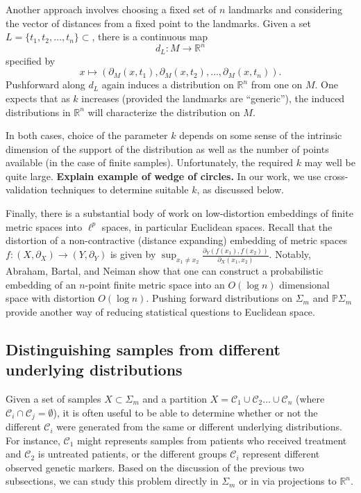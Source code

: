 \documentclass[a4paper,11pt]{article}
\newcommand{\aC}{\mathcal{C}}
\begin{document}
Another approach involves choosing a fixed set of $n$ landmarks and considering the vector of distances from a fixed point to the landmarks.
Given a set $L = \{t_1, t_2, \ldots, t_n\} \subset $, there is a continuous map
\[
d_L \colon M \to \mathbb{R}^n
\]
specified by
\[
x \mapsto (\partial_M(x,t_1), \partial_M(x,t_2), \ldots, \partial_M(x,t_n)).
\]
Pushforward along $d_L$ again induces a distribution on $\mathbb{R}^n$ from one on $M$.
One expects that as $k$ increases (provided the landmarks are ``generic''), the induced distributions in $\mathbb{R}^n$ will characterize the distribution on $M$.

In both cases, choice of the parameter $k$ depends on some sense of the intrinsic dimension of the support of the distribution as well as the number of points available (in the case of finite samples).
Unfortunately, the required $k$ may well be quite large.
{\bf Explain example of wedge of circles.}
In our work, we use cross-validation techniques to determine suitable $k$, as discussed below.

Finally, there is a substantial body of work on low-distortion embeddings of finite metric spaces into $\ell^p$ spaces, in particular Euclidean spaces.
Recall that the distortion of a non-contractive (distance expanding) embedding of metric spaces $f \colon (X, \partial_X) \to (Y, \partial_Y)$ is given by $\sup_{x_1 \neq x_2} \frac{\partial_Y (f(x_1), f(x_2))}{\partial_X (x_1, x_2)}$. 
Notably, Abraham, Bartal, and Neiman show that one can construct a probabilistic embedding of an $n$-point finite metric space into an $O(\log n)$ dimensional space with distortion $O(\log n)$.
Pushing forward distributions on $\Sigma_m$ and $\mathbb{P}\Sigma_m$ provide another way of reducing statistical questions to Euclidean space.

\subsection{Distinguishing samples from different underlying distributions}

Given a set of samples $X \subset \Sigma_m$ and a partition $X = \aC_1 \cup \aC_2 \ldots \cup \aC_n$ (where $\aC_i \cap \aC_j = \emptyset$), it is often useful to be able to determine whether or not the different $\aC_i$ were generated from the same or different underlying distributions.
For instance, $\aC_1$ might represents samples from patients who received treatment and $\aC_2$ is untreated patients, or the different groups $\aC_i$ represent different observed genetic markers.
Based on the discussion of the previous two subsections, we can study this problem directly in $\Sigma_m$ or in via projections to $\mathbb{R}^n$.
\end{document}
